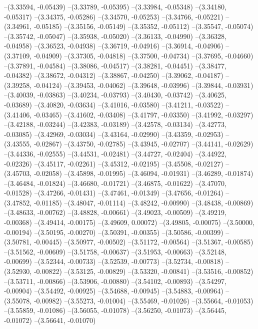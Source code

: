 --(3.33594, -0.05439)
--(3.33789, -0.05395)
--(3.33984, -0.05348)
--(3.34180, -0.05317)
--(3.34375, -0.05286)
--(3.34570, -0.05253)
--(3.34766, -0.05221)
--(3.34961, -0.05185)
--(3.35156, -0.05149)
--(3.35352, -0.05112)
--(3.35547, -0.05074)
--(3.35742, -0.05047)
--(3.35938, -0.05020)
--(3.36133, -0.04990)
--(3.36328, -0.04958)
--(3.36523, -0.04938)
--(3.36719, -0.04916)
--(3.36914, -0.04906)
--(3.37109, -0.04909)
--(3.37305, -0.04818)
--(3.37500, -0.04734)
--(3.37695, -0.04660)
--(3.37891, -0.04584)
--(3.38086, -0.04517)
--(3.38281, -0.04451)
--(3.38477, -0.04382)
--(3.38672, -0.04312)
--(3.38867, -0.04250)
--(3.39062, -0.04187)
--(3.39258, -0.04124)
--(3.39453, -0.04062)
--(3.39648, -0.03996)
--(3.39844, -0.03931)
--(3.40039, -0.03863)
--(3.40234, -0.03793)
--(3.40430, -0.03742)
--(3.40625, -0.03689)
--(3.40820, -0.03634)
--(3.41016, -0.03580)
--(3.41211, -0.03522)
--(3.41406, -0.03465)
--(3.41602, -0.03408)
--(3.41797, -0.03350)
--(3.41992, -0.03297)
--(3.42188, -0.03244)
--(3.42383, -0.03189)
--(3.42578, -0.03134)
--(3.42773, -0.03085)
--(3.42969, -0.03034)
--(3.43164, -0.02990)
--(3.43359, -0.02953)
--(3.43555, -0.02867)
--(3.43750, -0.02785)
--(3.43945, -0.02707)
--(3.44141, -0.02629)
--(3.44336, -0.02555)
--(3.44531, -0.02481)
--(3.44727, -0.02404)
--(3.44922, -0.02326)
--(3.45117, -0.02261)
--(3.45312, -0.02195)
--(3.45508, -0.02127)
--(3.45703, -0.02058)
--(3.45898, -0.01995)
--(3.46094, -0.01931)
--(3.46289, -0.01874)
--(3.46484, -0.01824)
--(3.46680, -0.01721)
--(3.46875, -0.01622)
--(3.47070, -0.01528)
--(3.47266, -0.01431)
--(3.47461, -0.01349)
--(3.47656, -0.01264)
--(3.47852, -0.01185)
--(3.48047, -0.01114)
--(3.48242, -0.00990)
--(3.48438, -0.00869)
--(3.48633, -0.00762)
--(3.48828, -0.00661)
--(3.49023, -0.00509)
--(3.49219, -0.00368)
--(3.49414, -0.00175)
--(3.49609, 0.00072)
--(3.49805, -0.00075)
--(3.50000, -0.00194)
--(3.50195, -0.00270)
--(3.50391, -0.00355)
--(3.50586, -0.00399)
--(3.50781, -0.00445)
--(3.50977, -0.00502)
--(3.51172, -0.00564)
--(3.51367, -0.00585)
--(3.51562, -0.00609)
--(3.51758, -0.00637)
--(3.51953, -0.00663)
--(3.52148, -0.00699)
--(3.52344, -0.00733)
--(3.52539, -0.00773)
--(3.52734, -0.00818)
--(3.52930, -0.00822)
--(3.53125, -0.00829)
--(3.53320, -0.00841)
--(3.53516, -0.00852)
--(3.53711, -0.00866)
--(3.53906, -0.00880)
--(3.54102, -0.00893)
--(3.54297, -0.00904)
--(3.54492, -0.00925)
--(3.54688, -0.00945)
--(3.54883, -0.00964)
--(3.55078, -0.00982)
--(3.55273, -0.01004)
--(3.55469, -0.01026)
--(3.55664, -0.01053)
--(3.55859, -0.01086)
--(3.56055, -0.01078)
--(3.56250, -0.01073)
--(3.56445, -0.01072)
--(3.56641, -0.01070)
